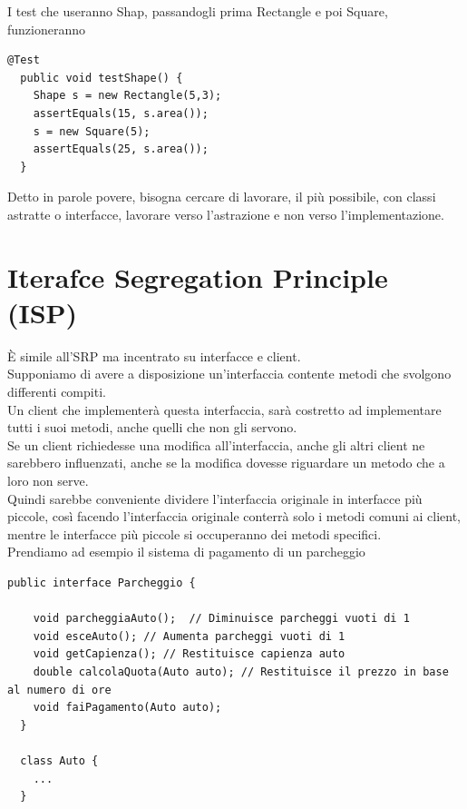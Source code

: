 I test che useranno Shap, passandogli prima Rectangle e poi Square, funzioneranno
\begin{lstlisting}[linewidth=6cm]
  @Test
  public void testShape() {
    Shape s = new Rectangle(5,3);
    assertEquals(15, s.area());
    s = new Square(5);
    assertEquals(25, s.area());
  }  
\end{lstlisting}

Detto in parole povere, bisogna cercare di lavorare, il più possibile, con classi astratte o interfacce, lavorare verso l'astrazione e non verso l'implementazione.

\newpage
\section{Iterafce Segregation Principle (ISP)}

È simile all’SRP ma incentrato su interfacce e client.\\
Supponiamo di avere a disposizione un'interfaccia contente metodi che svolgono differenti compiti.\\ 
Un client che implementerà questa interfaccia, sarà costretto ad implementare tutti i suoi metodi, anche quelli che non gli servono.\\
Se un client richiedesse una modifica all’interfaccia, anche gli altri client ne sarebbero influenzati, anche se la modifica dovesse riguardare un metodo che a loro non serve.\\
Quindi sarebbe conveniente dividere l'interfaccia originale in interfacce più piccole, così facendo l'interfaccia originale conterrà solo i metodi comuni ai client, mentre le interfacce più piccole si occuperanno dei metodi specifici.\\
Prendiamo ad esempio il sistema di pagamento di un parcheggio

\begin{lstlisting}[linewidth=15cm]
  public interface Parcheggio {

    void parcheggiaAuto();	// Diminuisce parcheggi vuoti di 1
    void esceAuto(); // Aumenta parcheggi vuoti di 1
    void getCapienza();	// Restituisce capienza auto
    double calcolaQuota(Auto auto); // Restituisce il prezzo in base al numero di ore
    void faiPagamento(Auto auto);
  }

  class Auto {
    ...
  }
\end{lstlisting}

